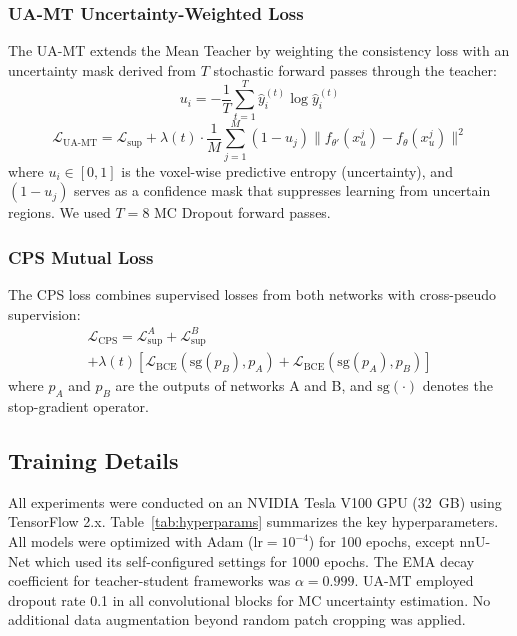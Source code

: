 \documentclass[journal, twocolumn]{IEEEtran}
\begin{document}
\subsubsection{UA-MT Uncertainty-Weighted Loss}
The UA-MT extends the Mean Teacher by weighting the consistency loss with an uncertainty mask derived from $T$ stochastic forward passes through the teacher:
\begin{equation}
u_i = -\frac{1}{T}\sum_{t=1}^{T} \hat{y}_i^{(t)} \log \hat{y}_i^{(t)}
\label{eq:uncertainty}
\end{equation}
\begin{equation}
\mathcal{L}_{\text{UA-MT}} = \mathcal{L}_{\text{sup}} + \lambda(t) \cdot \frac{1}{M}\sum_{j=1}^{M}(1 - u_j)\|f_{\theta'}(x_u^j) - f_\theta(x_u^j)\|^2
\label{eq:uamt}
\end{equation}
where $u_i \in [0, 1]$ is the voxel-wise predictive entropy (uncertainty), and $(1 - u_j)$ serves as a confidence mask that suppresses learning from uncertain regions. We used $T=8$ MC Dropout forward passes.

\subsubsection{CPS Mutual Loss}
The CPS loss combines supervised losses from both networks with cross-pseudo supervision:
\begin{multline}
\mathcal{L}_{\text{CPS}} = \mathcal{L}_{\text{sup}}^A + \mathcal{L}_{\text{sup}}^B \\
+ \lambda(t)\left[\mathcal{L}_{\text{BCE}}(\text{sg}(p_B), p_A) + \mathcal{L}_{\text{BCE}}(\text{sg}(p_A), p_B)\right]
\label{eq:cps}
\end{multline}
where $p_A$ and $p_B$ are the outputs of networks A and B, and $\text{sg}(\cdot)$ denotes the stop-gradient operator.

\subsection{Training Details}
All experiments were conducted on an NVIDIA Tesla V100 GPU (32~GB) using TensorFlow 2.x. Table~\ref{tab:hyperparams} summarizes the key hyperparameters. All models were optimized with Adam ($\text{lr} = 10^{-4}$) for 100 epochs, except nnU-Net which used its self-configured settings for 1000 epochs. The EMA decay coefficient for teacher-student frameworks was $\alpha = 0.999$. UA-MT employed dropout rate 0.1 in all convolutional blocks for MC uncertainty estimation. No additional data augmentation beyond random patch cropping was applied.
\end{document}
